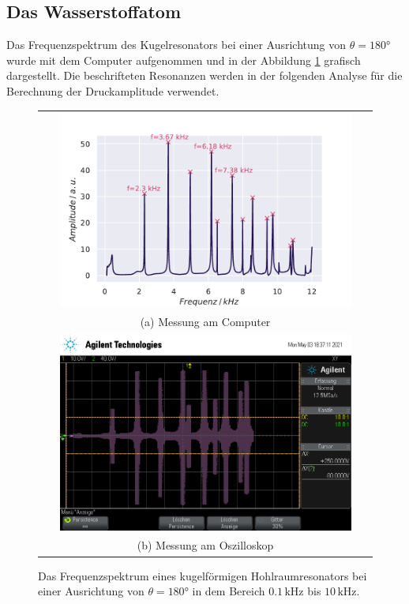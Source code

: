 \subsection{Das Wasserstoffatom}
Das Frequenzspektrum des Kugelresonators bei einer Ausrichtung von $\theta = 180°$ wurde mit dem Computer aufgenommen und in der Abbildung \ref{fig:h180} grafisch dargestellt. 
Die beschrifteten Resonanzen werden in der folgenden Analyse für die Berechnung der Druckamplitude verwendet. 
\begin{figure}[H]
    \centering
    \begin{tabular}{c}
    \includegraphics[width=0.9\textwidth]{Daten/Wasserstoff/H_180.pdf} \\
    (a) Messung am Computer \\[6pt]
    \includegraphics[width=0.9\textwidth]{Daten/Wasserstoff/H_180.png} \\
    (b) Messung am Oszilloskop \\[6pt]
    \end{tabular}
    \caption{Das Frequenzspektrum eines kugelförmigen Hohlraumresonators bei einer Ausrichtung von $\theta = 180\si{°}$ in dem Bereich $0.1 \,\si{\kilo\hertz}$ bis $10 \,\si{\kilo\hertz}$. }
    \label{fig:h180}
\end{figure}

